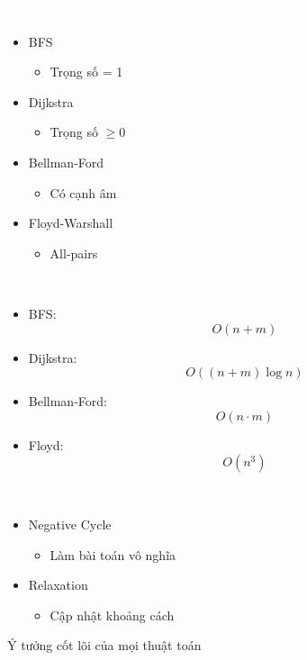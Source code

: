 \documentclass{beamer}
\newcommand{\hlblue}[1]{\textcolor{myblue}{#1}}
\newcommand{\hlgreen}[1]{\textcolor{mygreen}{#1}}
\newcommand{\hlred}[1]{\textcolor{myred}{#1}}
\newcommand{\hlpurple}[1]{\textcolor{mypurple}{#1}}
\newcommand{\hlwhite}[1]{\textcolor{white}{#1}}
\begin{document}
\begin{frame}{\hlwhite{Các thuật toán chính}}
\begin{itemize}
\item \hlblue{BFS}
\begin{itemize}
\item Trọng số = 1
\end{itemize}

\item \hlgreen{Dijkstra}
\begin{itemize}
\item Trọng số \hlgreen{$\ge 0$}
\end{itemize}

\item \hlred{Bellman-Ford}
\begin{itemize}
\item Có cạnh âm
\end{itemize}

\item \hlpurple{Floyd-Warshall}
\begin{itemize}
\item All-pairs
\end{itemize}
\end{itemize}
\end{frame}


\begin{frame}{\hlwhite{So sánh}}
\begin{itemize}
\item BFS:
\[
O(n + m)
\]

\item Dijkstra:
\[
O((n + m)\log n)
\]

\item Bellman-Ford:
\[
O(n \cdot m)
\]

\item Floyd:
\[
O(n^3)
\]
\end{itemize}
\end{frame}


\begin{frame}{\hlwhite{Vấn đề quan trọng}}
\begin{itemize}
\item \hlred{Negative Cycle}
\begin{itemize}
\item Làm bài toán vô nghĩa
\end{itemize}

\item \hlblue{Relaxation}
\begin{itemize}
\item Cập nhật khoảng cách
\end{itemize}
\end{itemize}

\begin{tcolorbox}
\centering
\hlpurple{Ý tưởng cốt lõi của mọi thuật toán}
\end{tcolorbox}
\end{frame}
\end{document}
